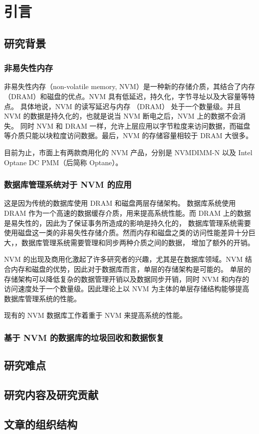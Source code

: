 
\chapter{引言}

\section{研究背景}

\subsection{非易失性内存}

非易失性内存（non-volatile memory, NVM）是一种新的存储介质，其结合了内存 （DRAM）和磁盘的优点。NVM 具有低延迟，持久化，字节寻址以及大容量等特点。
具体地说，NVM 的读写延迟与内存 （DRAM） 处于一个数量级。并且 NVM 的数据是持久化的，也就是说当 NVM 断电之后，NVM 上的数据不会消失。
同时 NVM 和 DRAM 一样，允许上层应用以字节粒度来访问数据，而磁盘等介质只能以块粒度访问数据。最后，NVM 的存储容量相较于 DRAM 大很多。

目前为止，市面上有两款商用化的 NVM 产品，分别是 NVMDIMM-N 以及 Intel Optane DC PMM（后简称 Optane）。

\subsection{数据库管理系统对于 NVM 的应用}

这是因为传统的数据库使用 DRAM 和磁盘两层存储架构。
数据库系统使用 DRAM 作为一个高速的数据缓存介质，用来提高系统性能。而 DRAM 上的数据是易失性的，因此为了保证事务所造成的影响是持久化的，
数据库管理系统需要使用磁盘这一类的非易失性存储介质。然而内存和磁盘之类的访问性能差异十分巨大，，数据库管理系统需要管理和同步两种介质之间的数据，
增加了额外的开销。

NVM 的出现及商用化激起了许多研究者的兴趣，尤其是在数据库领域。NVM 结合内存和磁盘的优势，因此对于数据库而言，单层的存储架构是可能的。
单层的存储架构可以降低复杂的数据管理开销以及数据同步开销，同时 NVM 和内存的访问速度处于一个数量级。因此理论上以 NVM 为主体的单层存储结构能够提高数据库管理系统的性能。

现有的 NVM 数据库工作着重于 NVM 来提高系统的性能。


\subsection{基于 NVM 的数据库的垃圾回收和数据恢复}

\section{研究难点}

\section{研究内容及研究贡献}

\section{文章的组织结构}

